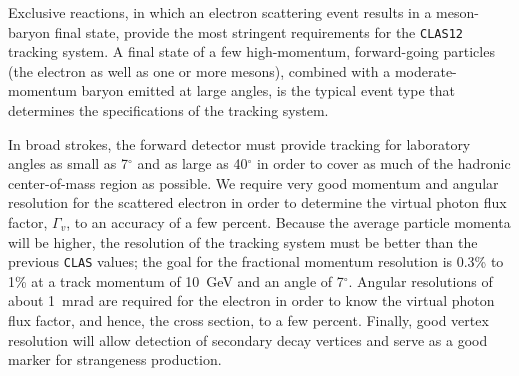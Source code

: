 Exclusive reactions, in which an electron scattering event 
results in a meson-baryon final state, provide the most 
stringent requirements for the {\tt CLAS12} tracking system.  A final state 
of a few high-momentum, forward-going particles (the electron as well as one 
or more mesons), combined with a moderate-momentum baryon emitted at large 
angles, is the typical event type that determines the specifications of the 
tracking system.

In broad strokes, the forward detector must provide tracking for laboratory angles as 
small as 7$^\circ$ and as large as 40$^\circ$ in order to cover as much of 
the hadronic center-of-mass region as possible.  We require very good momentum 
and angular resolution for the scattered electron in order to determine the 
virtual photon flux factor, $\Gamma_v$, to an accuracy of a few percent.
Because the average particle momenta will be higher, the resolution of the 
tracking system must be better than the previous {\tt CLAS} values; the goal 
for the fractional momentum resolution is 0.3\% to  1\% at a track momentum 
of 10~GeV and an angle of 7$^\circ$.  Angular resolutions of about 1~mrad are required for the electron 
in order to know the virtual photon flux factor, and hence, the cross section, 
to a few percent. Finally, good vertex resolution will allow detection of 
secondary decay vertices and serve as a good marker for strangeness production.


















































